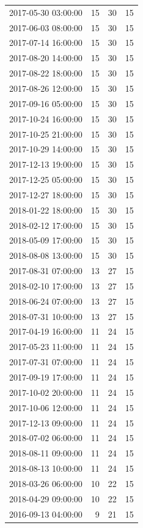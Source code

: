 \begin{tabular}{lrrr}
2017-05-30 03:00:00 & 15 & 30 & 15 \\
2017-06-03 08:00:00 & 15 & 30 & 15 \\
2017-07-14 16:00:00 & 15 & 30 & 15 \\
2017-08-20 14:00:00 & 15 & 30 & 15 \\
2017-08-22 18:00:00 & 15 & 30 & 15 \\
2017-08-26 12:00:00 & 15 & 30 & 15 \\
2017-09-16 05:00:00 & 15 & 30 & 15 \\
2017-10-24 16:00:00 & 15 & 30 & 15 \\
2017-10-25 21:00:00 & 15 & 30 & 15 \\
2017-10-29 14:00:00 & 15 & 30 & 15 \\
2017-12-13 19:00:00 & 15 & 30 & 15 \\
2017-12-25 05:00:00 & 15 & 30 & 15 \\
2017-12-27 18:00:00 & 15 & 30 & 15 \\
2018-01-22 18:00:00 & 15 & 30 & 15 \\
2018-02-12 17:00:00 & 15 & 30 & 15 \\
2018-05-09 17:00:00 & 15 & 30 & 15 \\
2018-08-08 13:00:00 & 15 & 30 & 15 \\
2017-08-31 07:00:00 & 13 & 27 & 15 \\
2018-02-10 17:00:00 & 13 & 27 & 15 \\
2018-06-24 07:00:00 & 13 & 27 & 15 \\
2018-07-31 10:00:00 & 13 & 27 & 15 \\
2017-04-19 16:00:00 & 11 & 24 & 15 \\
2017-05-23 11:00:00 & 11 & 24 & 15 \\
2017-07-31 07:00:00 & 11 & 24 & 15 \\
2017-09-19 17:00:00 & 11 & 24 & 15 \\
2017-10-02 20:00:00 & 11 & 24 & 15 \\
2017-10-06 12:00:00 & 11 & 24 & 15 \\
2017-12-13 09:00:00 & 11 & 24 & 15 \\
2018-07-02 06:00:00 & 11 & 24 & 15 \\
2018-08-11 09:00:00 & 11 & 24 & 15 \\
2018-08-13 10:00:00 & 11 & 24 & 15 \\
2018-03-26 06:00:00 & 10 & 22 & 15 \\
2018-04-29 09:00:00 & 10 & 22 & 15 \\
2016-09-13 04:00:00 & 9 & 21 & 15 \\

\end{tabular}
